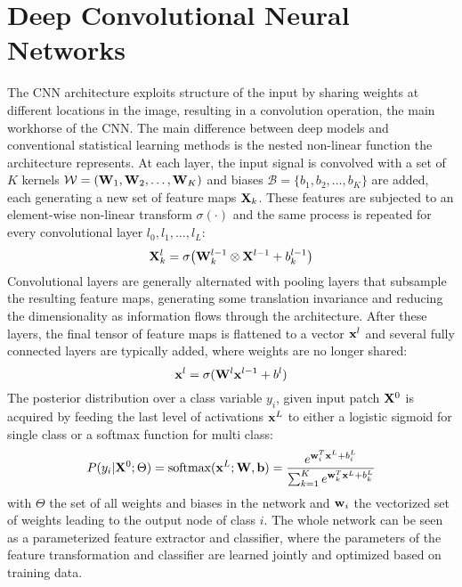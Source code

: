 \documentclass[12pt]{spieman}  %
\begin{document}
\section{Deep Convolutional Neural Networks}
\label{sec::multi_strean_cnns}
The CNN architecture exploits structure of the input by sharing weights at different locations in the image, resulting in a convolution operation, the main workhorse of the CNN. The main difference between deep models and conventional statistical learning methods is the nested non-linear function the architecture represents. At each layer, the input signal is convolved with a set of $K$ kernels $\mathcal{W} = ({\bf W}_{1}, {\bf W}_{2}, \ldots, {\bf W}_{K})$ and biases $\mathcal{B} = \{b_{1}, b_{2}, \ldots, b_{K}\}$ are added, each generating a new set of feature maps ${\bf X}_{k}$. These features are subjected to an element-wise non-linear transform $\sigma(\cdot)$ and the same process is repeated for every convolutional layer $l_{0}, l_{1}, \ldots, l_{L}$:
\begin{equation}{\bf X}_{k}^{l} = \sigma\big( {\bf W}_{k}^{l -1} \otimes {\bf X}^{l -1} + b_{k}^{l-1} \big)
\end{equation}
Convolutional layers are generally alternated with pooling layers that subsample the resulting feature maps, generating some translation invariance and reducing the dimensionality as information flows through the architecture. After these layers, the final tensor of feature maps is flattened to a vector ${\bf x}^{l}$ and several fully connected layers are typically added, where weights are no longer shared: 
\begin{equation}{\bf x}^{l} = \sigma({\bf W}^{l}{\bf x}^{l-1} + b^{l})
\end{equation}
The posterior distribution over a class variable $y_{i}$, given input patch ${\bf X}^{0}$ is acquired by feeding the last level of activations ${\bf x}^{L}$ to either a logistic sigmoid for single class or a softmax function for multi class:
\begin{equation}
 P(y_{i} | {\bf X}^{0}; \Theta) = \text{softmax}({\bf x}^{L}; {\bf W}, {\bf b}) = \frac{e^{{\bf w}_{i}^{T}{\bf x}^{L} + b^{L}_{i}}}{\sum^{K}_{k = 1} e^{{\bf w}_{k}^{T}{\bf x}^{L} + b^{L}_{k}}}
\end{equation}
with $\Theta$ the set of all weights and biases in the network and ${\bf w}_{i}$ the vectorized set of weights leading to the output node of class $i$. The whole network can be seen as a parameterized feature extractor and classifier, where the parameters of the feature transformation and classifier are learned jointly and optimized based on training data. \\
\end{document}
